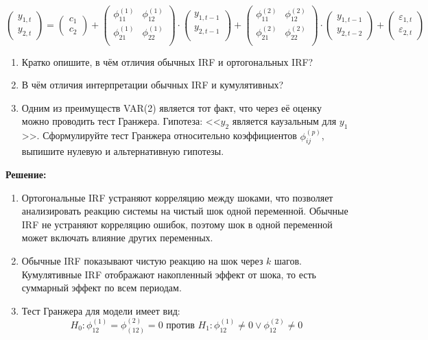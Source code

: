 \documentclass[10pt]{article}
\begin{document}
\begin{enumerate}
$$
    \begin{pmatrix}
        y_{1, t} \\
        y_{2, t}
    \end{pmatrix}
    =
    \begin{pmatrix}
        c_1 \\
        c_2
    \end{pmatrix}
    +
    \begin{pmatrix}
        \phi_{11}^{(1)} & \phi_{12}^{(1)} \\
        \phi_{21}^{(1)} & \phi_{22}^{(1)} \\
    \end{pmatrix}
    \cdot
    \begin{pmatrix}
        y_{1, t-1} \\
        y_{2, t-1} \\
    \end{pmatrix}
    +
    \begin{pmatrix}
        \phi_{11}^{(2)} & \phi_{12}^{(2)} \\
        \phi_{21}^{(2)} & \phi_{22}^{(2)} \\
    \end{pmatrix}
    \cdot
    \begin{pmatrix}
        y_{1, t-1} \\
        y_{2, t-2}
    \end{pmatrix}
    +
    \begin{pmatrix}
        \varepsilon_{1, t} \\
        \varepsilon_{2, t}
    \end{pmatrix}
$$
\begin{enumerate}
    \item Кратко опишите, в чём отличия обычных IRF и ортогональных IRF?
    \item В чём отличия интерпретации обычных IRF и кумулятивных?
    \item Одним из преимуществ VAR(2) является тот факт, что через её оценку можно проводить тест Гранжера.
    Гипотеза: <<$y_2$ является каузальным для $y_1$>>. Сформулируйте тест Гранжера относительно коэффициентов
    $\phi_{ij}^{(p)}$, выпишите нулевую и альтернативную гипотезы.
\end{enumerate}

\textbf{Решение:}

\begin{enumerate}
    \item  Ортогональные IRF устраняют корреляцию между шоками, что позволяет анализировать реакцию системы на чистый шок одной переменной.
    Обычные IRF не устраняют корреляцию ошибок, поэтому шок в одной переменной может включать влияние других переменных.
    \item  Обычные IRF показывают чистую реакцию на шок через $k$ шагов. Кумулятивные IRF отображают накопленный эффект от шока, то
    есть суммарный эффект по всем периодам.
    \item Тест Гранжера для модели имеет вид:
    $$H_0: \phi_{12}^{(1)} = \phi_{(12)}^{(2)} = 0 \text{ против } H_1: \phi_{12}^{(1)}\not=0\lor\phi_{12}^{(2)}\not=0$$
\end{enumerate}


\end{enumerate}
\end{document}
